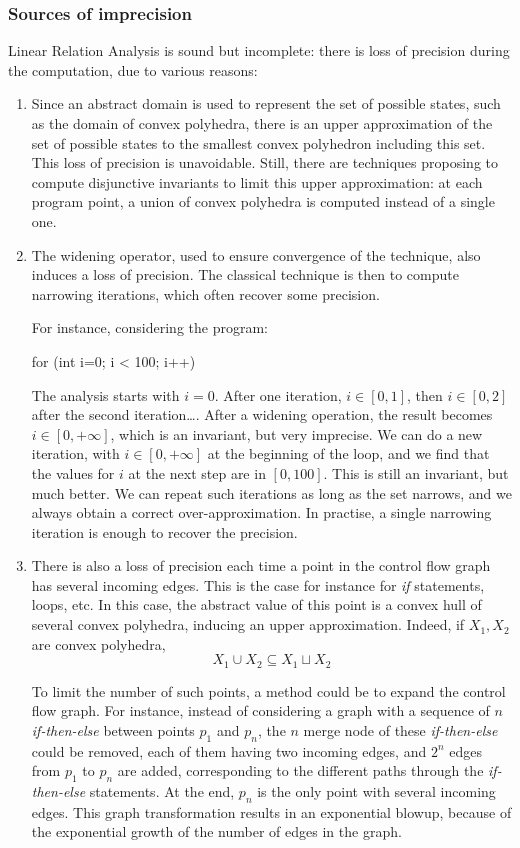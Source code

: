 \documentclass[a4paper,english,titlepage,11pt]{report}
\begin{document}
\subsubsection{Sources of imprecision}
 \label{multigraph}
Linear Relation Analysis is sound but incomplete: there is loss of precision
during the computation, due to various reasons:
\begin{enumerate}
\item Since an abstract domain is used to represent the set of possible states,
such as the domain of convex polyhedra, there is an upper approximation of the
set of possible states to the smallest convex polyhedron including this set. This
loss of precision is unavoidable. Still, there are techniques proposing to
compute disjunctive invariants \cite{GulwaniZ10} to limit this upper approximation: at each
program point, a union of convex polyhedra is computed instead of a single
one.
\item The widening operator, used to ensure convergence of the technique,
also induces a loss of precision. The classical technique is then to compute
narrowing iterations, which often recover some precision. 

For instance, considering the program:
\begin{C}
for (int i=0; i < 100; i++) {
}
\end{C}
The analysis starts with $i=0$. After one iteration, $i \in
[0,1]$, then $i\in [0,2]$ after the second iteration\dots. 
After a widening operation, the result becomes $i \in [0,
+\infty]$, which is an invariant, but very imprecise. We can do a new iteration,
with $i\in [0, +\infty]$ at the beginning of the loop, and we find that the
values for $i$ at the next step are in $[0, 100]$. This is still an invariant,
but much better. We can repeat such iterations as long as the set narrows, and
we always obtain a correct over-approximation.
In practise, a single narrowing iteration is enough to recover the precision.

\item There is also a loss of precision each time a point in the control flow
graph has several incoming edges. This is the case for instance for
\emph{if} statements, loops, etc. In this case, the abstract value of this point
is a convex hull of several convex polyhedra, inducing an upper approximation.
Indeed, if $X_1, X_2$ are convex polyhedra,
$$X_1 \cup X_2 \subseteq X_1 \sqcup X_2$$

To limit the number of such points, a method could be
to expand the control flow graph. For instance, instead of considering a graph
with a sequence of $n$ \emph{if-then-else} between points $p_1$ and $p_n$, 
the $n$ merge node
of these \emph{if-then-else} could be removed, each of them having two incoming
edges, and 
$2^n$ edges from $p_1$ to $p_n$ are added, corresponding to the different paths through
the \emph{if-then-else} statements. At the end, $p_n$ is the only point with
several incoming edges. This graph transformation results in an exponential
blowup, because of the exponential growth of the number of edges in the graph.
\end{enumerate}
\end{document}
